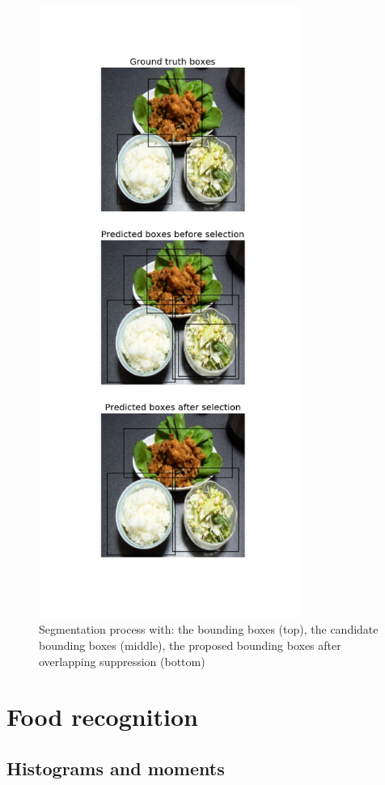 \begin{figure}
    \centering
    \includegraphics[height=20cm]{img/seg_97.jpg}
    \caption[Segmentation result]{Segmentation process with: the bounding boxes (top), the candidate bounding boxes (middle), the proposed bounding boxes after overlapping suppression (bottom)}
    \label{fig:seg_97}
\end{figure}

\section{Food recognition}
\subsection{Histograms and moments}

